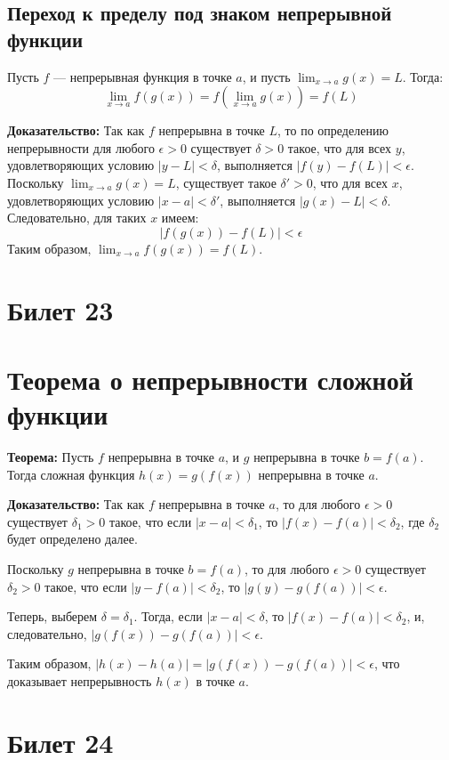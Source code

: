 \documentclass{article}
\begin{document}
\subsection*{Переход к пределу под знаком непрерывной функции}
Пусть $f$ — непрерывная функция в точке $a$, и пусть $\lim_{x \to a} g(x) = L$. Тогда:
\[
\lim_{x \to a} f(g(x)) = f\left(\lim_{x \to a} g(x)\right) = f(L)
\]

\textbf{Доказательство:} Так как $f$ непрерывна в точке $L$, то по определению непрерывности для любого $\epsilon > 0$ существует $\delta > 0$ такое, что для всех $y$, удовлетворяющих условию $|y - L| < \delta$, выполняется $|f(y) - f(L)| < \epsilon$. Поскольку $\lim_{x \to a} g(x) = L$, существует такое $\delta' > 0$, что для всех $x$, удовлетворяющих условию $|x - a| < \delta'$, выполняется $|g(x) - L| < \delta$. Следовательно, для таких $x$ имеем:
\[
|f(g(x)) - f(L)| < \epsilon
\]
Таким образом, $\lim_{x \to a} f(g(x)) = f(L)$.

\section{Билет 23}

\section*{Теорема о непрерывности сложной функции}

\textbf{Теорема:} Пусть $f$ непрерывна в точке $a$, и $g$ непрерывна в точке $b = f(a)$. Тогда сложная функция $h(x) = g(f(x))$ непрерывна в точке $a$.

\textbf{Доказательство:} Так как $f$ непрерывна в точке $a$, то для любого $\epsilon > 0$ существует $\delta_1 > 0$ такое, что если $|x - a| < \delta_1$, то $|f(x) - f(a)| < \delta_2$, где $\delta_2$ будет определено далее.

Поскольку $g$ непрерывна в точке $b = f(a)$, то для любого $\epsilon > 0$ существует $\delta_2 > 0$ такое, что если $|y - f(a)| < \delta_2$, то $|g(y) - g(f(a))| < \epsilon$.

Теперь, выберем $\delta = \delta_1$. Тогда, если $|x - a| < \delta$, то $|f(x) - f(a)| < \delta_2$, и, следовательно, $|g(f(x)) - g(f(a))| < \epsilon$.

Таким образом, $|h(x) - h(a)| = |g(f(x)) - g(f(a))| < \epsilon$, что доказывает непрерывность $h(x)$ в точке $a$.


\section{Билет 24}
\end{document}
